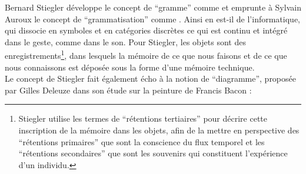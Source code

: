 \indent Bernard Stiegler développe le concept de ``gramme'' comme  et emprunte à Sylvain Auroux \cite{auroux_revolution_1994} le concept de ``grammatisation'' comme . Ainsi en est-il de l'informatique, qui dissocie en symboles et en catégories discrètes ce qui est continu et intégré dans le geste, comme dans le son. Pour Stiegler, les objets sont des enregistrements\footnote{Stiegler utilise les termes de ``rétentions tertiaires'' pour décrire cette inscription de la mémoire dans les objets, afin de la mettre en perspective des ``rétentions primaires'' que sont la conscience du flux temporel et les ``rétentions secondaires'' que sont les souvenirs qui constituent l'expérience d'un individu.}, dans lesquels la mémoire de ce que nous faisons et de ce que nous connaissons est déposée sous la forme d'une mémoire technique.\\
\indent Le concept de Stiegler fait également écho à la notion de ``diagramme'', proposée par Gilles Deleuze dans son étude sur la peinture de Francis Bacon \cite{deleuze_francis_1981} : \\
